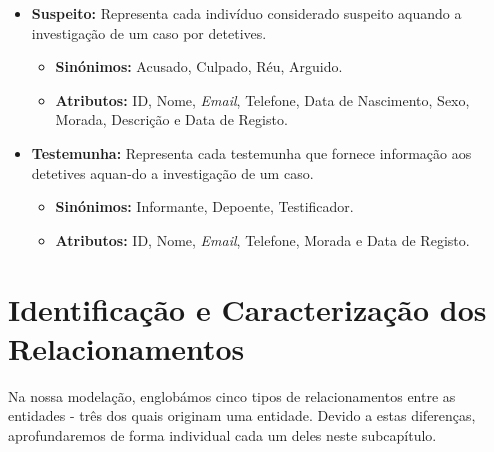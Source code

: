 \documentclass[a4paper,12pt]{scrreprt}
\begin{document}
\begin{itemize}
        \clearpage

        \item \textbf{Suspeito:} Representa cada indivíduo considerado suspeito aquando a investigação de um caso por detetives.
            \begin{itemize}
            \item\textbf{Sinónimos:} Acusado, Culpado, Réu, Arguido. 
            \item\textbf{Atributos:} ID, Nome, \textit{Email}, Telefone, Data de Nascimento, Sexo, Morada, Descrição e Data de Registo.
            \end{itemize}

        \item \textbf{Testemunha:} Representa cada testemunha que fornece informação aos detetives aquan-do a investigação de um caso.
            \begin{itemize}
            \item\textbf{Sinónimos:} Informante, Depoente, Testificador.
            \item\textbf{Atributos:} ID, Nome, \textit{Email}, Telefone, Morada e Data de Registo.
            \end{itemize}
        \end{itemize}

\pagebreak
    \section{Identificação e Caracterização dos Relacionamentos}
        \label{sec:relacionamentos}
        Na nossa modelação, englobámos cinco tipos de relacionamentos entre as entidades - três dos quais originam uma entidade. Devido a estas diferenças, aprofundaremos de forma individual cada um deles neste subcapítulo.

        \vspace{0.5cm}
\end{document}
